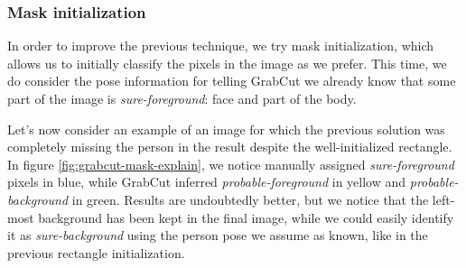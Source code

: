 \subsubsection{Mask initialization}
\label{subsec:masking-grabcut-mask}

In order to improve the previous technique, we try mask initialization, which allows us to initially classify the pixels in the image as we prefer. This time, we do consider the pose information for telling GrabCut we already know that some part of the image is \textit{sure-foreground}: face and part of the body.

Let's now consider an example of an image for which the previous solution was completely missing the person in the result despite the well-initialized rectangle.
In figure \ref{fig:grabcut-mask-explain}, we notice manually assigned \textit{sure-foreground} pixels in blue, while GrabCut inferred \textit{probable-foreground} in yellow and \textit{probable-background} in green. Results are undoubtedly better, but we notice that the left-most background has been kept in the final image, while we could easily identify it as \textit{sure-background} using the person pose we assume as known, like in the previous rectangle initialization.

